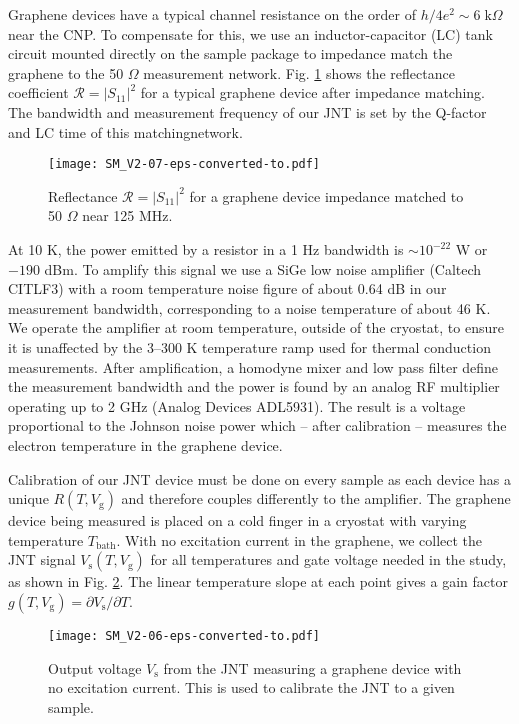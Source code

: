 \documentclass[10pt, oneside]{book}
\begin{document}
\begin{doublespace}
\begin{appendix}
Graphene devices have a typical channel resistance on the order of $h/4e^2 \sim 6\; \mathrm{k}\Omega$ near the CNP.   To compensate for this, we use an inductor-capacitor (LC) tank circuit mounted directly on the sample package to impedance match the graphene to the 50 $\Omega$ measurement network.  Fig.  \ref{figs2} shows the reflectance coefficient $\mathcal{R}=|S_{11}|^{2}$ for a typical graphene device after impedance matching.   The bandwidth and measurement frequency of our JNT is set by the Q-factor and LC time of this matchingnetwork.

 \begin{figure}
 \centering
\texttt{[image: SM\_V2-07-eps-converted-to.pdf]}
\caption{Reflectance $\mathcal{R}=|S_{11}|^{2}$ for a graphene device impedance matched to 50 $\Omega$ near 125 MHz.}
\label{figs2}
\end{figure}

At 10 K, the power emitted by a resistor in a 1 Hz bandwidth is $\sim 10^{-22}$ W or $-190$ dBm.  To amplify this signal we use a SiGe low noise amplifier (Caltech CITLF3) with a room temperature noise figure of about 0.64 dB in our measurement bandwidth, corresponding to a noise temperature of about 46 K.   We operate the amplifier at room temperature, outside of the cryostat, to ensure it is unaffected by the 3--300 K temperature ramp used for thermal conduction measurements.  After amplification, a homodyne mixer and low pass filter define the measurement bandwidth and the power is found by an analog RF multiplier operating up to 2 GHz (Analog Devices ADL5931).  The result is a voltage proportional to the Johnson noise power which -- after calibration -- measures the electron temperature in the graphene device.

Calibration of our JNT device must be done on every sample as each device has a unique $R(T,V_{\mathrm{g}})$ and therefore couples differently to the amplifier.  The graphene device being measured is placed on a cold finger in a cryostat with varying temperature $T_{\mathrm{bath}}$.  With no excitation current in the graphene, we collect the JNT signal $V_{\mathrm{s}}(T,V_{\mathrm{g}})$ for all temperatures and gate voltage needed in the study, as shown in Fig. \ref{figs3}.   The linear temperature slope at each point gives a gain factor $g(T,V_{\mathrm{g}}) = \partial V_{\mathrm{s}}/\partial T$.

 \begin{figure}
 \centering
\texttt{[image: SM\_V2-06-eps-converted-to.pdf]}
\caption{Output voltage $V_{\mathrm{s}}$ from the JNT measuring a graphene device with no excitation current.  This is used to calibrate the JNT to a given sample.}
\label{figs3}
\end{figure}



\end{appendix}
\end{doublespace}
\end{document}
